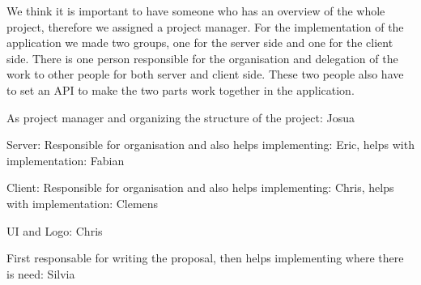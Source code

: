 \documentclass{report}
\begin{document}
We think it is important to have someone who has an overview of the whole project, therefore we assigned a project manager. For the implementation of the application we made two groups, one for the server side and one for the client side. There is one person responsible for the organisation and delegation of the work to other people for both server and client side. These two people also have to set an API to make the two parts work together in the application.

As project manager and organizing the structure of the project: Josua

Server: Responsible for organisation and also helps implementing: Eric, helps with implementation: Fabian

Client: Responsible for organisation and also helps implementing: Chris, helps with implementation: Clemens

UI and Logo: Chris

First responsable for writing the proposal, then helps implementing where there is need: Silvia




\end{document}
